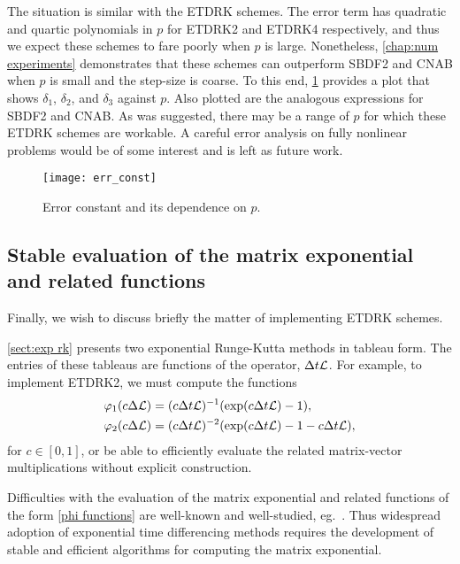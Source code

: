 The situation is similar with the ETDRK schemes. The error term has quadratic and quartic polynomials in $p$ for ETDRK2 and ETDRK4 respectively, and thus we expect these schemes to fare poorly when $p$ is large. Nonetheless, \cref{chap:num experiments} demonstrates that these schemes can outperform SBDF2 and CNAB when $p$ is small and the step-size is coarse. To this end, \cref{fig:err p dep} provides a plot that shows $\delta_1$, $\delta_2$, and $\delta_3$ against $p$. Also plotted are the analogous expressions for SBDF2 and CNAB. As was suggested, there may be a range of $p$ for which these ETDRK schemes are workable. A careful error analysis on fully nonlinear problems would be of some interest and is left as future work.

\begin{figure}[htb!]
        \centering
\texttt{[image: err\_const]}
\caption[Error constant and its dependence on $p$]{Error constant and its dependence on $p$. }
\label{fig:err p dep}
\end{figure}

\subsection{Stable evaluation of the matrix exponential and related functions}
Finally, we wish to discuss briefly the matter of implementing ETDRK schemes.

\cref{sect:exp rk} presents two exponential Runge-Kutta methods in tableau form. The entries of these tableaus are functions of the operator, $\Delta t\mathcal{L}$. For example, to implement ETDRK2, we must compute the functions 
\begin{align}
\varphi_1(c\Delta \mathcal{L}) &= (c\Delta t \mathcal{L})^{-1}(\exp(c\Delta t \mathcal{L}) - 1),
\\
\varphi_2(c\Delta \mathcal{L}) &= (c\Delta t\mathcal{L})^{-2}(\exp(c\Delta t \mathcal{L})  -1 - c\Delta t \mathcal{L}) ,
\end{align}
for $c \in [0,1]$, or be able to efficiently evaluate the related matrix-vector multiplications without explicit construction.

Difficulties with the evaluation of the matrix exponential and related functions of the form \cref{phi functions} are well-known and well-studied, eg.\ \cite{moler2003nineteen,higham2002accuracy,higham2008functions,hochbruck1997krylov}. Thus widespread adoption of exponential time differencing methods requires the development of stable and efficient algorithms for computing the matrix exponential. 

